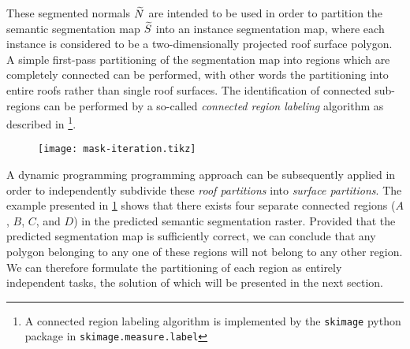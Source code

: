 \noindent
These segmented normals $\widetilde{N}$ are intended to be used in order to partition the semantic segmentation map $\widetilde{S}$ into an instance segmentation map, where each instance is considered to be a two-dimensionally projected roof surface polygon.
A simple first-pass partitioning of the segmentation map into regions which are completely connected can be performed, with other words the partitioning into entire roofs rather than single roof surfaces.
The identification of connected sub-regions can be performed by a so-called \textit{connected region labeling} algorithm as described in \cite{sklabel1,sklabel2}\footnote{A connected region labeling algorithm is implemented by the \texttt{skimage} python package in \texttt{skimage.measure.label}}.
\begin{figure}[H]
  \centering
  \texttt{[image: mask-iteration.tikz]}
  \label{fig:mask-iteration}
\end{figure}
\noindent
A dynamic programming programming approach can be subsequently applied in order to independently subdivide these \textit{roof partitions} into \textit{surface partitions}.
The example presented in \cref{fig:mask-iteration} shows that there exists four separate connected regions ($A$, $B$, $C$, and $D$) in the predicted semantic segmentation raster.
Provided that the predicted segmentation map is sufficiently correct, we can conclude that any polygon belonging to any one of these regions will not belong to any other region.
We can therefore formulate the partitioning of each region as entirely independent tasks, the solution of which will be presented in the next section.
